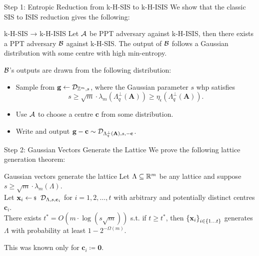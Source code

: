\documentclass[xcolor=table,10pt,aspectratio=169]{beamer}
\renewcommand{\vec}[1]{\ensuremath{\mathbf{#1}}\xspace}
\providecommand{\mat}[1]{\ensuremath{\vec{#1}}\xspace}
\begin{document}
\begin{frame}[label={sec:org60d0161}]{Step 1: Entropic Reduction from k-H-SIS to k-H-ISIS}
We show that the classic SIS to ISIS reduction gives the following:

\begin{alertblock}{k-H-SIS → k-H-ISIS}
Let \(\mathcal{A}\) be PPT adversary against k-H-ISIS, then there exists a PPT adversary \(\mathcal{B}\) against k-H-SIS. The output of \(\mathcal{B}\) follows a Gaussian distribution with some centre with high min-entropy.
\end{alertblock}

\(\mathcal{B}\)'s outputs are drawn from the following distribution:

\begin{itemize}
\item Sample from \(\vec{g} \gets \ddv_{\ZZ^m, s}\), where the Gaussian parameter \(s\) whp satisfies \[s \geq \sqrt{m} \cdot \lambda_m(\Lambda_q^\bot(\mat{A})) \geq \eta_{\epsilon}(\Lambda_q^\bot(\mat{A})).\]
\item Use \(\mathcal{A}\) to choose a centre \(\vec{c}\) from some distribution.
\item Write and output \(\vec{g} - \mathbf{c} \sim \ddv_{\Lambda_q^\bot(\mat{A}), s, -\vec{c}}\).
\end{itemize}
\end{frame}

\begin{frame}[label={sec:org687fb4f}]{Step 2: Gaussian Vectors Generate the Lattice}
We prove the following lattice generation theorem:

\begin{alertblock}{Gaussian vectors generate the lattice}
Let \(\Lambda \subseteq \mathbb{R}^m\) be any lattice and suppose \(s \geq \sqrt{m} \cdot \lambda_m(\Lambda)\).\\[0pt]
Let \(\vec{x}_i \sample \ddv_{\Lambda,s,\vec{c}_i}\) for \(i = 1,2,\ldots,t\) with arbitrary and potentially distinct centres \(\vec{c}_i\).\\[0pt]
There exists \(t^* = O(m \cdot \log(s \sqrt{m}))\) s.t. if \(t \geq t^*\), then \(\set{\vec{x}_i}_{i\in \{1 \ldots t\}}\) generates \(\Lambda\) with probability at least \(1-2^{-\Omega(m)}\).
\end{alertblock}

This was known only for \(\vec{c}_i \coloneqq \vec{0}\).
\end{frame}
\end{document}
